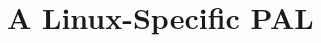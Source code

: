 \chapter{A Linux-Specific PAL}
\label{chap:linux}

\makeatletter
{}
\makeatother
\graphicspath{{linux/figures/}}








\makeatletter
{}
\makeatother
\graphicspath{{}}